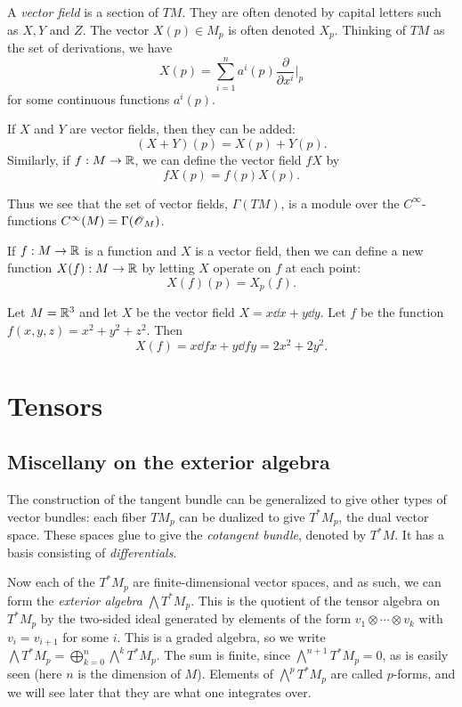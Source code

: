 \documentclass[11pt, english]{article}
\begin{document}
A \emph{vector field} is a section of $TM$. They are often denoted by capital letters such as $X,Y$ and $Z$. The vector $X(p) \in M_p$ is often denoted $X_p$. Thinking of $TM$ as the set of derivations, we have
\[
X(p) = \sum_{i=1}^n a^i(p) \frac{\partial}{\partial x^i} \Big|_p
\]
for some continuous functions $a^i(p)$.

If $X$ and $Y$ are vector fields, then they can be added:
\[
(X+Y)(p) = X(p) + Y(p).
\]
Similarly, if $f: M \to \mathbb{R}$, we can define the vector field $fX$ by
\[
fX(p) = f(p) X(p).
\]

Thus we see that the set of vector fields, $\Gamma(TM)$, is a module over the $C^\infty$-functions $C^\infty(M)=\Gamma(\operatorname{\mathscr{O}}_
M)$.

If $f: M \to \mathbb{R}$ is a function and $X$ is a vector field, then we can define a new function ${X}(f):M \to \mathbb{R}$ by letting $X$ operate on $f$ at each point:
\[
X(f)(p) = X_p(f).
\]

\begin{example}
  Let $M=\mathbb{R}^3$ and let $X$ be the vector field $X= x \dd{}{x} + y \dd{}{y}$. Let $f$ be the function $f(x,y,z)=x^2+y^2+z^2$. Then
\[
X(f) = x \dd{f}{x} + y \dd{f}{y} = 2x^2+2y^2.
\]
\end{example}

\newpage
\section{Tensors}

 \subsection{Miscellany on the exterior algebra}
The construction of the tangent bundle can be generalized to give other types of vector bundles: each fiber $TM_p$ can be dualized to give $T^\ast M_p$, the dual vector space. These spaces glue to give the \emph{cotangent bundle}, denoted by $T^\ast M$. It has a basis consisting of \emph{differentials}.

Now each of the $T^\ast M_p$ are finite-dimensional vector spaces, and as such, we can form the \emph{exterior algebra} $\bigwedge T^\ast M_p$. This is the quotient of the tensor algebra on $T^\ast M_p$ by the two-sided ideal generated by elements of the form $v_1 \otimes \cdots \otimes v_k$ with $v_i=v_{i+1}$ for some $i$.  This is a graded algebra, so we write $\bigwedge T^\ast M_p = \bigoplus_{k=0}^n \bigwedge^k T^\ast M_p$. The sum is finite, since $\bigwedge^{n+1} T^\ast M_p=0$, as is easily seen (here $n$ is the dimension of $M$). Elements of $\bigwedge^p T^\ast M_p$ are called $p$-forms, and we will see later that they are what one integrates over.
\end{document}

